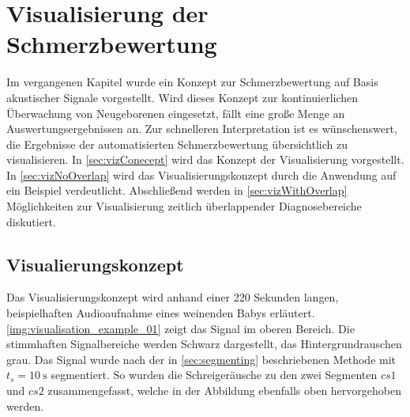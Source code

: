 \chapter{Visualisierung der Schmerzbewertung}
\label{sec:visualisation}

Im vergangenen Kapitel wurde ein Konzept zur Schmerzbewertung auf Basis akustischer Signale vorgestellt. Wird dieses Konzept zur kontinuierlichen Überwachung von Neugeborenen eingesetzt, fällt eine große Menge an Auswertungsergebnissen an. Zur schnelleren Interpretation ist es wünschenswert, die Ergebnisse der automatisierten Schmerzbewertung übersichtlich zu visualisieren. In \autoref{sec:vizConecept} wird das Konzept der Visualisierung vorgestellt. In \autoref{sec:vizNoOverlap} wird das Visualisierungskonzept durch die Anwendung auf ein Beispiel verdeutlicht. Abschließend werden in \autoref{sec:vizWithOverlap} Möglichkeiten zur Visualisierung zeitlich überlappender Diagnosebereiche diskutiert.

\section{Visualierungskonzept}
\label{sec:vizConecept}

Das Visualisierungskonzept wird anhand einer 220 Sekunden langen, beispielhaften Audioaufnahme eines weinenden Babys erläutert. \autoref{img:visualisation_example_01} zeigt das Signal im oberen Bereich. Die stimmhaften Signalbereiche werden Schwarz dargestellt, das Hintergrundrauschen grau. Das Signal wurde nach der in \autoref{sec:segmenting} beschriebenen Methode mit $t_{s} = \SI{10}{\second}$ segmentiert. So wurden die Schreigeräusche zu den zwei Segmenten $cs1$ und $cs2$ zusammengefasst, welche in der Abbildung ebenfalls oben hervorgehoben werden.

